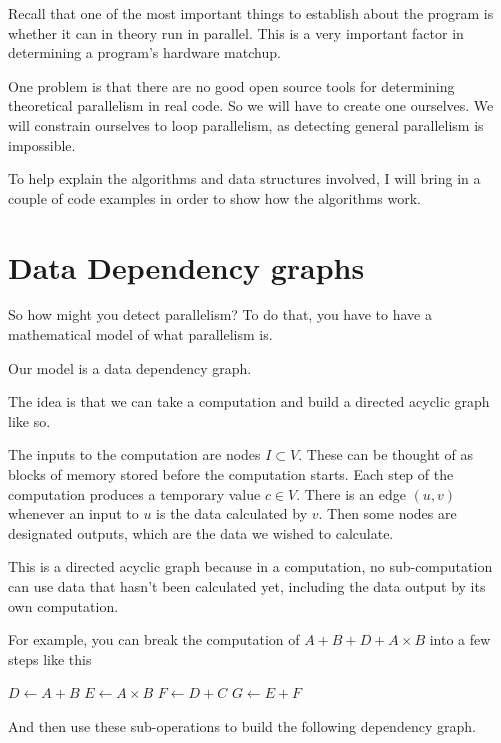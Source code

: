 \documentclass[12pt,twoside]{reedthesis}
\begin{document}
		Recall that one of the most important things to establish about the program is whether it can in theory run in parallel. This is a very important factor in determining a program's hardware matchup.

		One problem is that there are no good open source tools for determining theoretical parallelism in real code. So we will have to create one ourselves. We will constrain ourselves to loop parallelism, as detecting general parallelism is impossible. 
		
		To help explain the algorithms and data structures involved, I will bring in a couple of code examples in order to show how the algorithms work. 
		


	\section{Data Dependency graphs}
		So how might you detect parallelism? To do that, you have to have a mathematical model of what parallelism is.

		Our model is a data dependency graph.

		The idea is that we can take a computation and build a directed acyclic graph like so.

		The inputs to the computation are nodes $I \subset V$. These can be thought of as blocks of memory stored before the computation starts. Each step of the computation produces a temporary value $c \in V$. There is an edge $(u,v)$ whenever an input to $u$ is the data calculated by $v$. Then some nodes are designated outputs, which are the data we wished to calculate.

		This is a directed acyclic graph because in a computation, no sub-computation can use data that hasn't been calculated yet, including the data output by its own computation.

		For example, you can break the computation of $A+B+D+A\times B$ into a few steps like this

		\begin{algorithmic}[1]
			\State $D \gets A+B$
			\State $E \gets A\times B$
			\State $F \gets D+C$
			\State $G \gets E+F$
		\end{algorithmic}

		And then use these sub-operations to build the following dependency graph.
\end{document}
